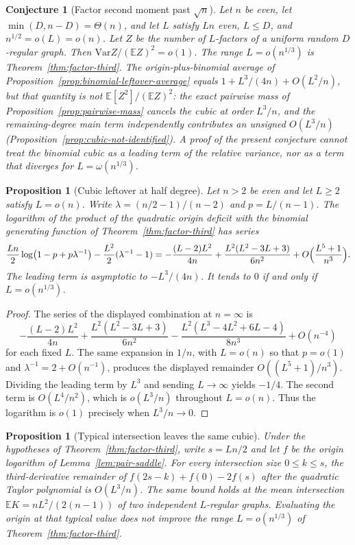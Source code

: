 \documentclass[11pt]{article}
\newtheorem{proposition}[theorem]{Proposition}
\newtheorem{conjecture}[theorem]{Conjecture}
\newcommand{\EE}{\mathbb{E}}
\newcommand{\Var}{\mathrm{Var}}
\begin{document}
\begin{conjecture}[Factor second moment past \(\sqrt{n}\)]
\label{conj:factor-moment}
Let \(n\) be even, let \(\min(D,n-D)=\Theta(n)\), and let \(L\) satisfy \(Ln\) even, \(L\le D\), and \(n^{1/2}=o(L)=o(n)\).
Let \(Z\) be the number of \(L\)-factors of a uniform random \(D\)-regular graph.
Then \(\Var Z/(\EE Z)^2=o(1)\).
The range \(L=o(n^{1/3})\) is Theorem~\ref{thm:factor-third}.
The origin-plus-binomial average of Proposition~\ref{prop:binomial-leftover-average} equals \(1+L^3/(4n)+O(L^2/n)\), but that quantity is not \(\EE[Z^2]/(\EE Z)^2\): the exact pairwise mass of Proposition~\ref{prop:pairwise-mass} cancels the cubic at order \(L^3/n\), and the remaining-degree main term independently contributes an unsigned \(O(L^3/n)\) (Proposition~\ref{prop:cubic-not-identified}).
A proof of the present conjecture cannot treat the binomial cubic as a leading term of the relative variance, nor as a term that diverges for \(L=\omega(n^{1/3})\).
\end{conjecture}

\begin{proposition}[Cubic leftover at half degree]
\label{prop:factor-cubic}
Let \(n>2\) be even and let \(L\ge 2\) satisfy \(L=o(n)\). Write \(\lambda=(n/2-1)/(n-2)\) and \(p=L/(n-1)\). The logarithm of the product of the quadratic origin deficit with the binomial generating function of Theorem~\ref{thm:factor-third} has series
\[
\frac{Ln}{2}\log\bigl(1-p+p\lambda^{-1}\bigr)-\frac{L^2}{2}(\lambda^{-1}-1)
=
-\frac{(L-2)L^2}{4n}+\frac{L^2(L^2-3L+3)}{6n^2}+O\Bigl(\frac{L^5+1}{n^3}\Bigr).
\]
The leading term is asymptotic to \(-L^3/(4n)\). It tends to \(0\) if and only if \(L=o(n^{1/3})\).
\end{proposition}

\begin{proof}
The series of the displayed combination at \(n=\infty\) is
\[
-\frac{(L-2)L^2}{4n}+\frac{L^2(L^2-3L+3)}{6n^2}-\frac{L^2(L^3-4L^2+6L-4)}{8n^3}+O(n^{-4})
\]
for each fixed \(L\).
The same expansion in \(1/n\), with \(L=o(n)\) so that \(p=o(1)\) and \(\lambda^{-1}=2+O(n^{-1})\), produces the displayed remainder \(O((L^5+1)/n^3)\).
Dividing the leading term by \(L^3\) and sending \(L\to\infty\) yields \(-1/4\).
The second term is \(O(L^4/n^2)\), which is \(o(L^3/n)\) throughout \(L=o(n)\).
Thus the logarithm is \(o(1)\) precisely when \(L^3/n\to 0\).
\end{proof}

\begin{proposition}[Typical intersection leaves the same cubic]
\label{prop:typical-origin}
Under the hypotheses of Theorem~\ref{thm:factor-third}, write \(s=Ln/2\) and let \(f\) be the origin logarithm of Lemma~\ref{lem:pair-saddle}.
For every intersection size \(0\le k\le s\), the third-derivative remainder of \(f(2s-k)+f(0)-2f(s)\) after the quadratic Taylor polynomial is \(O(L^3/n)\).
The same bound holds at the mean intersection \(\EE K=nL^2/(2(n-1))\) of two independent \(L\)-regular graphs.
Evaluating the origin at that typical value does not improve the range \(L=o(n^{1/3})\) of Theorem~\ref{thm:factor-third}.
\end{proposition}
\end{document}
